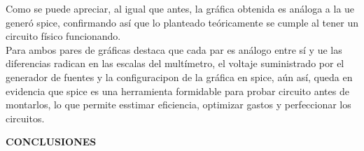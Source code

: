 \documentclass[12pt]{article}
\begin{document}
	\noindent Como se puede apreciar, al igual que antes, la gráfica obtenida es análoga a la ue generó spice, confirmando así que lo planteado teóricamente se cumple al tener un circuito físico funcionando.\\
	
	\noindent Para ambos pares de gráficas destaca que cada par es análogo entre sí y ue las diferencias radican en las escalas del multímetro, el voltaje suministrado por el generador de fuentes y la configuracipon de la gráfica en spice, aún así, queda en evidencia que spice es una herramienta formidable para probar circuito antes de montarlos, lo que permite esstimar eficiencia, optimizar gastos y perfeccionar los circuitos.
	
	\newpage
	
	\begin{center}
		\textbf{\large CONCLUSIONES}\\
	\end{center}
	
	\renewcommand{\theenumi}{\alph{enumi}} %
	
\end{document}
